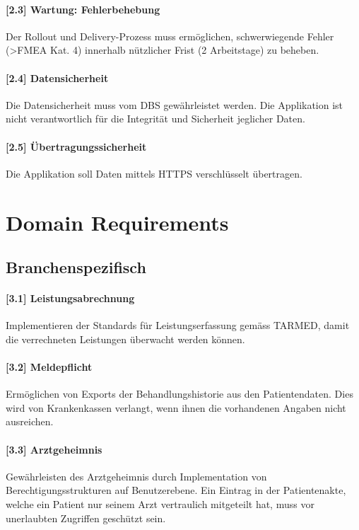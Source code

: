 \documentclass[a4paper]{scrreprt}
\begin{document}
\paragraph{[2.3] Wartung: Fehlerbehebung}
Der Rollout und Delivery-Prozess muss ermöglichen, schwerwiegende Fehler (\textgreater FMEA Kat. 4) innerhalb nützlicher Frist (2 Arbeitstage) zu beheben.

\paragraph{[2.4] Datensicherheit}
Die Datensicherheit muss vom DBS gewährleistet werden. Die Applikation ist nicht verantwortlich für die Integrität und Sicherheit jeglicher Daten.
 
\paragraph{[2.5] Übertragungssicherheit}
Die Applikation soll Daten mittels HTTPS verschlüsselt übertragen. 

\section{Domain Requirements}
\subsection{Branchenspezifisch}
\paragraph{[3.1] Leistungsabrechnung} Implementieren der Standards für Leistungserfassung gemäss TARMED, damit die verrechneten Leistungen überwacht werden können.

\paragraph{[3.2] Meldepflicht} Ermöglichen von Exports der Behandlungshistorie aus den Patientendaten. Dies wird von Krankenkassen verlangt, wenn ihnen die vorhandenen Angaben nicht ausreichen.

\paragraph{[3.3] Arztgeheimnis} Gewährleisten des Arztgeheimnis durch Implementation von Berechtigungsstrukturen auf Benutzerebene. Ein Eintrag in der Patientenakte, welche ein Patient nur seinem Arzt vertraulich mitgeteilt hat, muss vor unerlaubten Zugriffen geschützt sein.
\end{document}
